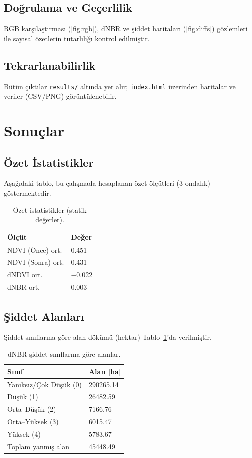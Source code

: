 \documentclass[11pt,a4paper]{article}
\begin{document}
\subsection{Doğrulama ve Geçerlilik}
RGB karşılaştırması (\autoref{fig:rgb}), dNBR ve şiddet haritaları (\autoref{fig:diffs}) gözlemleri ile sayısal özetlerin tutarlılığı kontrol edilmiştir. 

\subsection{Tekrarlanabilirlik}
Bütün çıktılar \texttt{results/} altında yer alır; \texttt{index.html} üzerinden haritalar ve veriler (CSV/PNG) görüntülenebilir.
\section{Sonuçlar}
\subsection{Özet İstatistikler}
Aşağıdaki tablo, bu çalışmada hesaplanan özet ölçütleri (3 ondalık) göstermektedir.
\begin{table}[H]
  \centering
  \begin{tabular}{@{}ll@{}}
  \toprule
  Ölçüt & Değer \\
  \midrule
  NDVI (Önce) ort. & \num{0.451} \\
  NDVI (Sonra) ort. & \num{0.431} \\
  dNDVI ort. & \num{-0.022} \\
  dNBR ort. & \num{0.003} \\
  \bottomrule
  \end{tabular}
  \caption{Özet istatistikler (statik değerler).}
\end{table}

\subsection{Şiddet Alanları}
Şiddet sınıflarına göre alan dökümü (hektar) Tablo~\ref{tab:areas}'da verilmiştir.
\begin{table}[H]
  \centering
  \begin{tabular}{@{}ll@{}}
  \toprule
  Sınıf & Alan [ha] \\
  \midrule
  Yanıksız/Çok Düşük (0) & \num{290265.14} \\
  Düşük (1) & \num{26482.59} \\
  Orta--Düşük (2) & \num{7166.76} \\
  Orta--Yüksek (3) & \num{6015.47} \\
  Yüksek (4) & \num{5783.67} \\
  Toplam yanmış alan & \num{45448.49} \\
  \bottomrule
  \end{tabular}
  \caption{dNBR şiddet sınıflarına göre alanlar.}
  \label{tab:areas}
\end{table}
\end{document}
